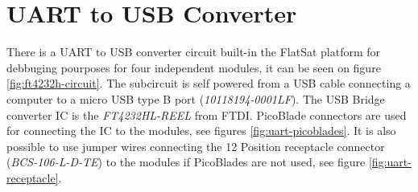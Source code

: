 \section{UART to USB Converter}

There is a UART to USB converter circuit built-in the FlatSat platform for debbuging pourposes for four independent modules, it can be seen on figure \ref{fig:ft4232h-circuit}. The subcircuit is self powered from a USB cable connecting a computer to a micro USB type B port (\textit{10118194-0001LF}). The    
USB Bridge converter IC is the \textit{FT4232HL-REEL} from FTDI. PicoBlade connectors are used for connecting the IC to the modules, see figures \ref{fig:uart-picoblades}. It is also possible to use jumper wires connecting the 12 Position receptacle connector (\textit{BCS-106-L-D-TE}) to the modules if PicoBlades are not used, see figure \ref{fig:uart-receptacle}.